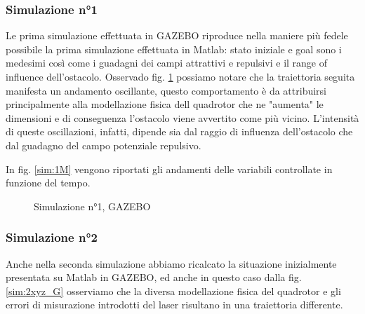 \documentclass[a4paper,10pt]{article}
\begin{document}
\subsubsection*{Simulazione n°1}
Le prima simulazione effettuata in GAZEBO riproduce nella maniere più fedele possibile la prima simulazione effettuata in Matlab: stato iniziale e goal sono i medesimi così come i guadagni dei campi attrattivi e repulsivi e il range of influence dell'ostacolo. 
Osservado fig. \ref{sim:1xy_G} possiamo notare che la traiettoria seguita manifesta un andamento oscillante, questo comportamento è da attribuirsi principalmente alla modellazione fisica dell quadrotor che ne "aumenta" le dimensioni e di conseguenza l'ostacolo viene avvertito come più vicino. L'intensità di queste oscillazioni, infatti, dipende sia dal raggio di influenza dell'ostacolo che dal guadagno del campo potenziale repulsivo.

In fig. \ref{sim:1M} vengono riportati gli andamenti delle variabili controllate in funzione del tempo.

\begin{figure}
\centering
{}
\caption{Simulazione n°1, GAZEBO}
\label{sim:1xy_G}
\end{figure}

\subsubsection*{Simulazione n°2}
Anche nella seconda simulazione abbiamo ricalcato la situazione inizialmente presentata su Matlab in GAZEBO, ed anche in questo caso dalla fig. \ref{sim:2xyz_G} osserviamo che la diversa modellazione fisica del quadrotor e gli errori di misurazione introdotti del laser risultano in una traiettoria differente.
\end{document}
